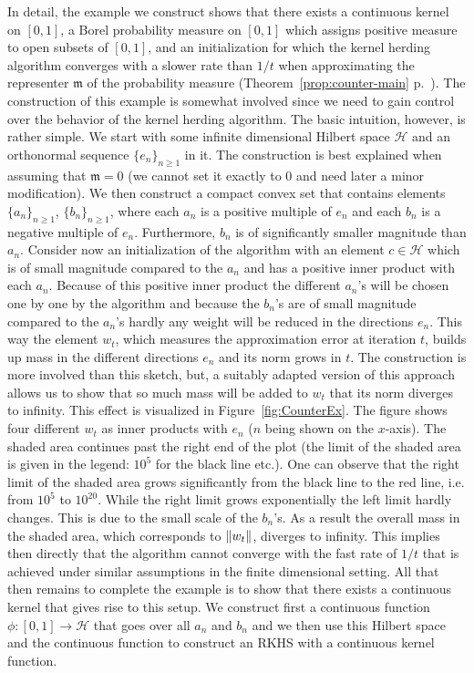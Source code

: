 \documentclass[AHL,Unicode,longabstracts,published]{cedram}
\theoremstyle{remark}
\newcommand{\cH}{\mathcal{H}}
\newcommand{\mean}{\mathfrak{m}}
\providecommand{\norm}[1]{\left\lVert#1\right\rVert}
\let\originalleft\left
\let\originalright\right
\renewcommand{\left}{\mathopen{}\mathclose\bgroup\originalleft}
\renewcommand{\right}{\aftergroup\egroup\originalright}
\begin{document}
In detail, the example we construct shows that there exists a continuous kernel on $[0,1]$, a Borel probability measure on $[0,1]$ which assigns positive measure to open subsets of $[0,1]$, and an initialization for which the kernel herding algorithm converges with a slower rate than $1/t$ when approximating the representer $\mean$ of the probability measure (Theorem~\ref{prop:counter-main} p.~\pageref{prop:counter-main}). The construction of this example is somewhat involved since we need to gain control over the behavior of the kernel herding algorithm. The basic intuition, however, is rather simple. We start with some infinite dimensional Hilbert space $\cH$ and an orthonormal sequence $\{e_n\}_{n\geq 1}$ in it. The construction is best explained when assuming that $\mean = 0 $ (we cannot set it exactly to $0$ and need later a minor modification). We then construct a compact convex set that contains elements $\{a_n\}_{n\geq 1}$, $\{b_n\}_{n\geq 1}$, where each $a_n$ is a positive multiple of $e_n$ and each $b_n$ is a negative multiple of $e_n$. Furthermore, $b_n$ is of significantly smaller magnitude than $a_n$. Consider now an initialization of the algorithm with an element $c \in \cH$ which is of small magnitude compared to the $a_n$ and has a positive inner product with each $a_n$. Because of this positive inner product the different $a_n$'s will be chosen one by one by the algorithm and because the $b_n$'s are of small magnitude compared to the $a_n$'s hardly any weight will be reduced in the directions $e_n$. This way the element $w_t$, which measures the approximation error at iteration $t$, builds up mass in the different directions $e_n$ and its norm grows in $t$. The construction is more involved than this sketch, but, a suitably adapted version of this approach allows us to show that so much mass will be added to $w_t$ that its norm diverges to infinity. This effect is visualized in Figure~\ref{fig:CounterEx}. The figure shows four different $w_t$ as inner products with $e_n$ ($n$ being shown on the $x$-axis). The shaded area continues past the right end of the plot (the limit of the shaded area is given in the legend: $10^5$ for the black line etc.). One can observe that the right limit of the shaded area grows significantly from the black line to the red line, i.e. from $10^5$ to $10^{20}$. While the right limit grows exponentially the left limit hardly changes. This is due to the small scale of the $b_n$'s. As a result the overall mass in the shaded area, which corresponds to $\norm{w_t}$, diverges to infinity. This implies then directly that the algorithm cannot converge with the fast rate of $1/t$ that is achieved under similar assumptions in the finite dimensional setting. All that then remains to complete the example is to show that there exists a continuous kernel that gives rise to this setup. We construct first a continuous function $\phi:[0,1] \rightarrow \cH$ that goes over all $a_n$ and $b_n$ and we then use this Hilbert space and the continuous function to construct an RKHS with a continuous kernel function.
\end{document}
